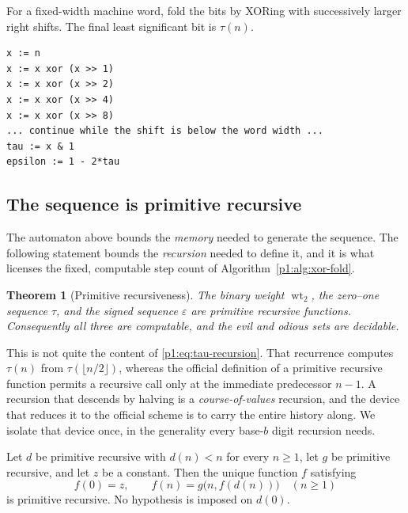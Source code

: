 \documentclass[11pt,oneside]{article}
\numberwithin{equation}{section}
\newtheorem{theorem}{Theorem}[section]
\theoremstyle{definition}
\theoremstyle{remark}
\newcommand{\wt}{\operatorname{wt}_2}
\newcommand{\eps}{\varepsilon}
\begin{document}
\begin{algorithm}
\label{p1:alg:xor-fold}
For a fixed-width machine word, fold the bits by XORing with successively
larger right shifts.  The final least significant bit is \(\tau(n)\).
\begin{lstlisting}[style=pseudo]
x := n
x := x xor (x >> 1)
x := x xor (x >> 2)
x := x xor (x >> 4)
x := x xor (x >> 8)
... continue while the shift is below the word width ...
tau := x & 1
epsilon := 1 - 2*tau
\end{lstlisting}
\end{algorithm}

\subsection{The sequence is primitive recursive}
\label{p1:sec:primitive-recursive}

The automaton above bounds the \emph{memory} needed to generate the
sequence.  The following statement bounds the \emph{recursion} needed to
define it, and it is what licenses the fixed, computable step count of
Algorithm~\ref{p1:alg:xor-fold}.

\begin{theorem}[Primitive recursiveness]
\label{p1:thm:primitive-recursive}
The binary weight \(\wt\), the zero--one sequence \(\tau\), and the
signed sequence \(\eps\) are primitive recursive functions.
Consequently all three are computable, and the evil and odious sets are
decidable.
\end{theorem}

This is not quite the content of \eqref{p1:eq:tau-recursion}.  That
recurrence computes \(\tau(n)\) from \(\tau(\lfloor n/2\rfloor)\),
whereas the official definition of a primitive recursive function permits
a recursive call only at the immediate predecessor \(n-1\).  A recursion
that descends by halving is a \emph{course-of-values} recursion, and the
device that reduces it to the official scheme is to carry the entire
history along.  We isolate that device once, in the generality every
base-\(b\) digit recursion needs.

\begin{lemma}
\label{p1:lem:descent-recursion}
Let \(d\) be primitive recursive with \(d(n)<n\) for every
\(n\ge1\), let \(g\) be primitive recursive, and let \(z\) be a
constant.  Then the unique function \(f\) satisfying
\begin{equation}
  f(0)=z,
  \qquad
  f(n)=g\bigl(n,f(d(n))\bigr)\quad(n\ge1)
  \label{p1:eq:descent-recursion}
\end{equation}
is primitive recursive.  No hypothesis is imposed on \(d(0)\).
\end{lemma}
\end{document}
